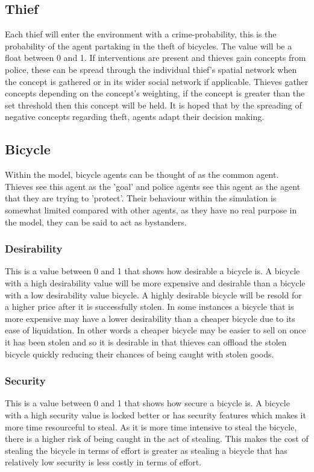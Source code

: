 \documentclass[11pt]{informatics-report}
\begin{document}
\subsection{Thief}
Each thief will enter the environment with a crime-probability, this is the probability of the agent partaking in the theft of bicycles. The value will be a float between 0 and 1. If interventions are present and thieves gain concepts from police, these can be spread through the individual thief's spatial network when the concept is gathered or in its wider social network if applicable. Thieves gather concepts depending on the concept's weighting, if the concept is greater than the set threshold then this concept will be held. It is hoped that by the spreading of negative concepts regarding theft, agents adapt their decision making.

\subsection{Bicycle}
Within the model, bicycle agents can be thought of as the common agent. Thieves see this agent as the 'goal' and police agents see this agent as the agent that they are trying to 'protect'. Their behaviour within the simulation is somewhat limited compared with other agents, as they have no real purpose in the model, they can be said to act as bystanders.
\subsubsection{Desirability}
This is a value between 0 and 1 that shows how desirable a bicycle is. A bicycle with a high desirability value will be more expensive and desirable than a bicycle with a low desirability value bicycle.  A highly desirable bicycle will be resold for a higher price after it is successfully stolen. In some instances a bicycle that is more expensive may have a lower desirability than a cheaper bicycle due to its ease of liquidation. In other words a cheaper bicycle may be easier to sell on once it has been stolen and so it is desirable in that thieves can offload the stolen bicycle quickly reducing their chances of being caught with stolen goods.

\subsubsection{Security}
This is a value between 0 and 1 that shows how secure a bicycle is. A bicycle with a high security value is locked better or has security features which makes it more time resourceful to steal. As it is more time intensive to steal the bicycle, there is a higher risk of being caught in the act of stealing. This makes the cost of stealing the bicycle in terms of effort is greater as stealing a bicycle that has relatively low security is less costly in terms of effort.
\end{document}
